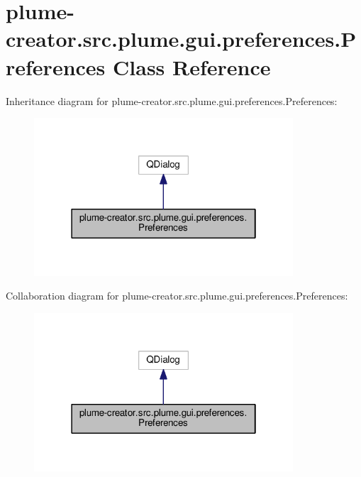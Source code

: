 \hypertarget{classplume-creator_1_1src_1_1plume_1_1gui_1_1preferences_1_1_preferences}{}\section{plume-\/creator.src.\+plume.\+gui.\+preferences.\+Preferences Class Reference}
\label{classplume-creator_1_1src_1_1plume_1_1gui_1_1preferences_1_1_preferences}


Inheritance diagram for plume-\/creator.src.\+plume.\+gui.\+preferences.\+Preferences\+:\nopagebreak
\begin{figure}[H]
\begin{center}
\leavevmode
\includegraphics[width=274pt]{classplume-creator_1_1src_1_1plume_1_1gui_1_1preferences_1_1_preferences__inherit__graph}
\end{center}
\end{figure}


Collaboration diagram for plume-\/creator.src.\+plume.\+gui.\+preferences.\+Preferences\+:\nopagebreak
\begin{figure}[H]
\begin{center}
\leavevmode
\includegraphics[width=274pt]{classplume-creator_1_1src_1_1plume_1_1gui_1_1preferences_1_1_preferences__coll__graph}
\end{center}
\end{figure}
